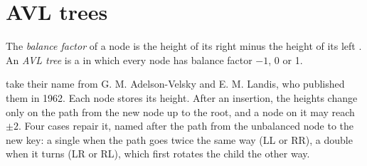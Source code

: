 \label{lst:b1:balanced-trees:rotate}

\section{AVL trees}\label{sec:b1:balanced-trees:avl}

\begin{definition}\label{def:b1:balanced-trees:avl}
The \emph{balance factor} of a node is the height of its right  minus the height of its left
. An \emph{AVL tree} is a  in which every node has balance factor $-1$, 0 or 1.
\end{definition}

 take their name from G. M. Adelson-Velsky and E. M. Landis, who published them in 1962. Each node stores its
height. After an insertion, the heights change only on the path from the new node up to the root, and a node on it may
reach  $\pm 2$. Four cases repair it, named after the path from the unbalanced node to the new key: a
single  when the path goes twice the same way (LL or RR), a double  when it turns (LR or RL), which
first rotates the child the other way.

\label{lst:b1:balanced-trees:rebalance}

